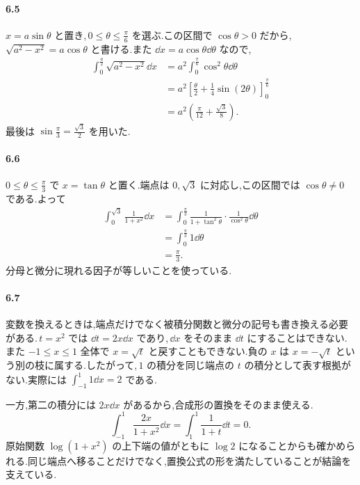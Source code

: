 \paragraph{6.5}
$x=a\sin\theta$ と置き,\,$0\le\theta\le\frac\pi6$ を選ぶ.この区間で $\cos\theta>0$ だから,\,$\sqrt{a^2-x^2}=a\cos\theta$ と書ける.また $\dd x=a\cos\theta\dd\theta$ なので,
\[
\begin{aligned}
 \int_0^{\frac a2}\sqrt{a^2-x^2}\dd x
 &=a^2\int_0^{\frac\pi6}\cos^2\theta\dd\theta\\
 &=a^2\left[\frac\theta2+\frac14\sin(2\theta)\right]_0^{\frac\pi6}\\
 &=a^2\left(\frac\pi{12}+\frac{\sqrt3}{8}\right).
\end{aligned}
\]
最後は $\sin\frac\pi3=\frac{\sqrt3}{2}$ を用いた.

\paragraph{6.6}
$0\le\theta\le\frac\pi3$ で $x=\tan\theta$ と置く.端点は $0,\sqrt3$ に対応し,この区間では $\cos\theta\ne0$ である.よって
\begin{align*}
 \int_0^{\sqrt3}\frac1{1+x^2}\dd x
 &=\int_0^{\frac\pi3}\frac1{1+\tan^2\theta}\cdot
   \frac1{\cos^2\theta}\dd\theta\\
 &=\int_0^{\frac\pi3}1\dd\theta\\
 &=\frac\pi3.
\end{align*}
分母と微分に現れる因子が等しいことを使っている.

\paragraph{6.7}
変数を換えるときは,端点だけでなく被積分関数と微分の記号も書き換える必要がある.\,$t=x^2$ では $\dd t=2x\dd x$ であり,\,$\dd x$ をそのまま $\dd t$ にすることはできない.また $-1\le x\le1$ 全体で $x=\sqrt{t}$ と戻すこともできない.負の $x$ は $x=-\sqrt{t}$ という別の枝に属する.したがって,\,$1$ の積分を同じ端点の $t$ の積分として表す根拠がない.実際には $\int_{-1}^1 1\dd x=2$ である.

一方,第二の積分には $2x\dd x$ があるから,合成形の置換をそのまま使える.
\[
 \int_{-1}^1\frac{2x}{1+x^2}\dd x
 =\int_1^1\frac1{1+t}\dd t=0.
\]
原始関数 $\log(1+x^2)$ の上下端の値がともに $\log2$ になることからも確かめられる.同じ端点へ移ることだけでなく,置換公式の形を満たしていることが結論を支えている.
